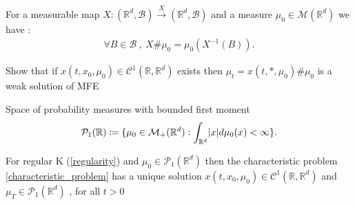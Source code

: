\begin{notation}
  For a measurable map $X : (\mathbb{R}^{d },\mathcal{B} ) \xrightarrow{X} (\mathbb{R}^{d },\mathcal{B} )$
  and a measure  $\mu_0 \in \mathcal{M}(\mathbb{R}^{d } )$ we have : 
 \begin{align*}
     \forall B \in  \mathcal{B} \ , \ X \# \mu_0 = \mu_0(X^{-1}(B) ) 
 .\end{align*} 
\end{notation}
\begin{exercise}
 Show that if $x(t,x_0,\mu_0) \in  \mathcal{C}^{1}(\mathbb{R},\mathbb{R}^{d } ) $  exists 
 then $\mu_t = x(t,*,\mu_0)\#\mu_0$ is a weak solution of MFE
\end{exercise}
\begin{definition}
  Space of probability measures with bounded first moment
  \begin{align*}
    \mathcal{P}_1(\mathbb{R}) \coloneqq  \{\mu_0 \in  \mathcal{M}_{+}(\mathbb{R}^{d } ) : \int_{\mathbb{R}^{d } } \lvert x\rvert d\mu_0(x) <\infty\}  
  .\end{align*}
\end{definition}
\begin{theorem}
  For regular K (\ref{regularity})  and  $\mu_0 \in  \mathcal{P}_1(\mathbb{R}^{d } )$ then the characteristic problem \ref{characteristic_problem} has a unique solution 
  $x(t,x_0,\mu_0) \in  \mathcal{C}^{1}(\mathbb{R},\mathbb{R}^{d} ) $ and $\mu_T \in  \mathcal{P}_1(\mathbb{R}^{d} )$ , for all $t>0 $
\end{theorem}
